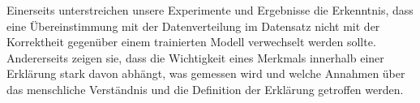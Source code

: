 Einerseits unterstreichen unsere Experimente und Ergebnisse die Erkenntnis, dass eine Übereinstimmung mit der Datenverteilung im Datensatz nicht mit der Korrektheit gegenüber einem trainierten Modell verwechselt werden sollte. Andererseits zeigen sie, dass die Wichtigkeit eines Merkmals innerhalb einer Erklärung stark davon abhängt, was gemessen wird und welche Annahmen über das menschliche Verständnis und die Definition der Erklärung getroffen werden.


